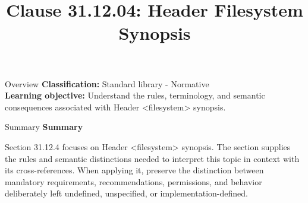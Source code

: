 \documentclass[10pt,letterpaper]{article}
\title{Clause 31.12.04: Header Filesystem Synopsis}
\author{}
\date{}
\begin{document}
\maketitle
\begin{CornellOverviewBox}{Overview}
\textbf{Classification:} Standard library - Normative\\[2pt]
\textbf{Learning objective:} Understand the rules, terminology, and semantic consequences associated with Header <filesystem> synopsis.
\end{CornellOverviewBox}\begin{CornellSummaryBox}{Summary}
{\sffamily\bfseries\color{Accent} Summary}\par\vspace{3pt}Section 31.12.4 focuses on Header <filesystem> synopsis. The section supplies the rules and semantic distinctions needed to interpret this topic in context with its cross-references. When applying it, preserve the distinction between mandatory requirements, recommendations, permissions, and behavior deliberately left undefined, unspecified, or implementation-defined.
\end{CornellSummaryBox}
\end{document}
